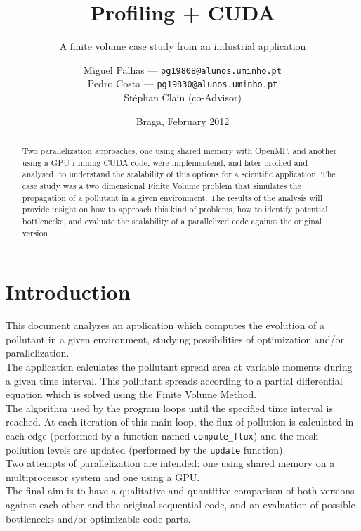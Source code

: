 \documentclass[9pt,twocolumn]{scrartcl}
\title{Profiling + CUDA}
\subtitle{A finite volume case study from an industrial application}
\author{Miguel Palhas \hfill--- \texttt{\smaller pg19808@alunos.uminho.pt}\\Pedro Costa \hfill--- \texttt{\smaller pg19830@alunos.uminho.pt}\\\smaller Stéphan Clain (co-Advisor)\\
}
\date{Braga, February 2012}
\begin{document}
\maketitle

\begin{abstract}
Two parallelization approaches, one using shared memory with OpenMP, and another using a GPU running CUDA code, were implementend, and later profiled and analysed, to understand the scalability of this options for a scientific application. The case study was a two dimensional Finite Volume problem that simulates the propagation of a pollutant in a given environment. The results of the analysis will provide insight on how to approach this kind of problems, how to identify potential bottlenecks, and evaluate the scalability of a parallelized code against the original version.
\end{abstract}

\section{Introduction}
This document analyzes an application which computes the evolution of a pollutant in a given environment, studying possibilities of optimization and/or parallelization.\\

The application calculates the pollutant spread area at variable moments during a given time interval. This pollutant spreads according to a partial differential equation which is solved using the Finite Volume Method.\\

The algorithm used by the program loops until the specified time interval is reached. At each iteration of this main loop, the flux of pollution is calculated in each edge (performed by a function named \texttt{compute\_flux}) and the mesh pollution levels are updated (performed by the \texttt{update} function).\\

Two attempts of parallelization are intended: one using shared memory on a multiprocessor system and one using a GPU.\\

The final aim is to have a qualitative and quantitive comparison of both versions against each other and the original sequential code, and an evaluation of possible bottlenecks and/or optimizable code parts.\\
\end{document}
